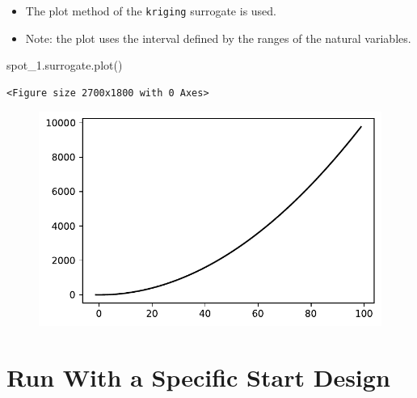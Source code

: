 \documentclass[
  letterpaper,
  DIV=11,
  numbers=noendperiod]{scrreprt}
\newenvironment{Shaded}{\begin{snugshade}}{\end{snugshade}}
\newcommand{\NormalTok}[1]{\textcolor[rgb]{0.00,0.23,0.31}{#1}}
\providecommand{\tightlist}{%
  \setlength{\itemsep}{0pt}\setlength{\parskip}{0pt}}\usepackage{longtable,booktabs,array}
\begin{document}
\begin{itemize}
\tightlist
\item
  The plot method of the \texttt{kriging} surrogate is used.
\item
  Note: the plot uses the interval defined by the ranges of the natural
  variables.
\end{itemize}

\begin{Shaded}
\begin{Highlighting}[]
\NormalTok{spot\_1.surrogate.plot()}
\end{Highlighting}
\end{Shaded}

\begin{verbatim}
<Figure size 2700x1800 with 0 Axes>
\end{verbatim}

\begin{figure}[H]

{\centering \includegraphics{a_04_spot_doc_files/figure-pdf/cell-9-output-2.pdf}

}

\end{figure}

\hypertarget{run-with-a-specific-start-design}{%
\section{Run With a Specific Start
Design}\label{run-with-a-specific-start-design}}
\end{document}
